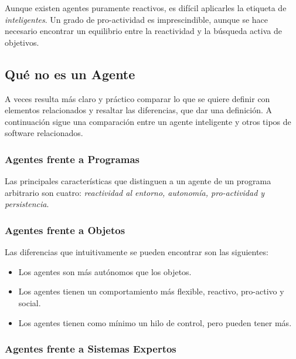 Aunque existen agentes puramente reactivos, es difícil aplicarles la etiqueta
de {\em inteligentes}. Un grado de pro-actividad es imprescindible, aunque se
hace necesario encontrar un equilibrio entre la reactividad y la búsqueda
activa de objetivos.


\subsection*{Qué no es un Agente}


A veces resulta más claro y práctico comparar lo que se quiere definir con
elementos relacionados y resaltar las diferencias, que dar una definición. A
continuación sigue una comparación entre un agente inteligente y otros tipos de
software relacionados.

\subsubsection*{Agentes frente a Programas}

Las principales características que distinguen a un agente de un programa
arbitrario son cuatro: {\em reactividad al entorno, autonomía, pro-actividad y
persistencia}.


\subsubsection*{Agentes frente a Objetos}

Las diferencias que intuitivamente se pueden encontrar son las siguientes:

\begin{itemize}
 \item Los agentes son más autónomos que los objetos.
 \item Los agentes tienen un comportamiento más flexible, reactivo, pro-activo
 y social.
 \item Los agentes tienen como mínimo un hilo de control, pero pueden tener más.
\end{itemize}


\subsubsection*{Agentes frente a Sistemas Expertos}

